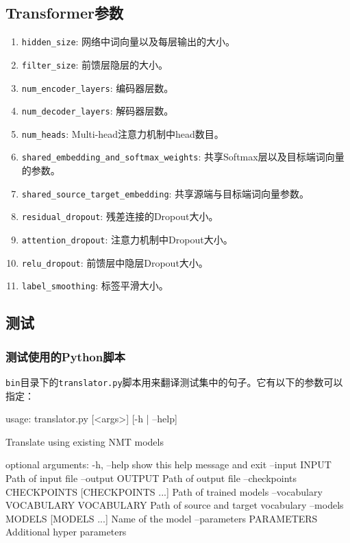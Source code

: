 \documentclass{article}
\begin{document}
\subsection{Transformer参数}
\begin{enumerate}
\item \verb|hidden_size|: 网络中词向量以及每层输出的大小。
\item \verb|filter_size|: 前馈层隐层的大小。
\item \verb|num_encoder_layers|: 编码器层数。
\item \verb|num_decoder_layers|: 解码器层数。
\item \verb|num_heads|: Multi-head注意力机制中head数目。
\item \verb|shared_embedding_and_softmax_weights|: 共享Softmax层以及目标端词向量的参数。
\item \verb|shared_source_target_embedding|: 共享源端与目标端词向量参数。
\item \verb|residual_dropout|: 残差连接的Dropout大小。
\item \verb|attention_dropout|: 注意力机制中Dropout大小。
\item\verb|relu_dropout|: 前馈层中隐层Dropout大小。
\item \verb|label_smoothing|: 标签平滑大小。
\end{enumerate}


\subsection{测试}
\subsubsection{测试使用的Python脚本}
\verb|bin|目录下的\verb|translator.py|脚本用来翻译测试集中的句子。它有以下的参数可以指定：

\begin{everbatim}
usage: translator.py [<args>] [-h | --help]

Translate using existing NMT models

optional arguments:
  -h, --help            show this help message and exit
  --input INPUT         Path of input file
  --output OUTPUT       Path of output file
  --checkpoints CHECKPOINTS [CHECKPOINTS ...]
                        Path of trained models
  --vocabulary VOCABULARY VOCABULARY
                        Path of source and target vocabulary
  --models MODELS [MODELS ...]
                        Name of the model
  --parameters PARAMETERS
                        Additional hyper parameters
\end{everbatim}
\end{document}
